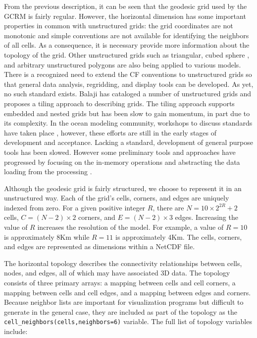 From the previous description, it can be seen that the geodesic grid used by
the GCRM is fairly regular. However, the horizontal dimension has some
important properties in common with unstructured grids: the grid coordinates
are not monotonic and simple conventions are not available for identifying the
neighbors of all cells.  As a consequence, it is necessary provide more
information about the topology of the grid. Other unstructured grids such as
triangular, cubed sphere \cite{CUBE}, and arbitrary unstructured polygons are
also being applied to various models.  There is a recognized need to extend
the CF conventions to unstructured grids so that general data analysis,
regridding, and display tools can be developed. As yet, no such standard
exists.  Balaji has cataloged a number of unstructured grids \cite{Balaji} and
proposes a tiling approach to describing grids.  The tiling approach supports
embedded and nested grids but has been slow to gain momentum, in part due to
its complexity.  In the ocean modeling community, workshops to discuss
standards have taken place \cite{UGRIDS}, however, these efforts are still in
the early stages of development and acceptance.   Lacking a standard,
development of general purpose tools has been slowed.  However some
preliminary tools and approaches have progressed by focusing on the in-memory
operations and abstracting the data loading from the processing \cite{UGRID}. 

Although the geodesic grid is fairly structured, we choose to represent it in
an unstructured way.  Each of the grid's cells, corners, and edges are
uniquely indexed from zero.  For a given positive integer $R$, there are $N =
10 \times 2^{2R} + 2$ cells, $C = (N-2) \times 2$ corners, and $E = (N-2)
\times 3$ edges.  Increasing the value of $R$ increases the resolution of the
model.  For example, a value of $R=10$ is approximately 8Km while $R=11$ is
approximately 4Km.  The cells, corners, and edges are represented as
dimensions within a NetCDF file.

The horizontal topology describes the connectivity relationships between
cells, nodes, and edges, all of which may have associated 3D data.  The
topology consists of three primary arrays: a mapping between cells and cell
corners, a mapping between cells and cell edges, and a mapping between edges
and corners.  Because neighbor lists are important for visualization programs
but difficult to generate in the general case, they are included as part of
the topology as the \verb+cell_neighbors(cells,neighbors=6)+ variable.  The
full list of topology variables include:

